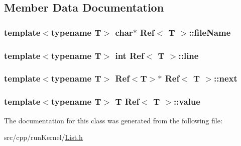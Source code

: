 \subsection{Member Data Documentation}
\hypertarget{class_ref_a857cf85cc41d722e4ac58f22d31e2605}{
\subsubsection[{file\-Name}]{\setlength{\rightskip}{0pt plus 5cm}template$<$typename T$>$ char$\ast$ {\bf Ref}$<$ T $>$\-::file\-Name\hspace{0.3cm}{\ttfamily [private]}}}\label{class_ref_a857cf85cc41d722e4ac58f22d31e2605}
\hypertarget{class_ref_ae083f82bbdedc5c5f3bb42c05b6ef810}{
\subsubsection[{line}]{\setlength{\rightskip}{0pt plus 5cm}template$<$typename T$>$ int {\bf Ref}$<$ T $>$\-::line\hspace{0.3cm}{\ttfamily [private]}}}\label{class_ref_ae083f82bbdedc5c5f3bb42c05b6ef810}
\hypertarget{class_ref_aaad23b64a53270e7539d79df0c5ab386}{
\subsubsection[{next}]{\setlength{\rightskip}{0pt plus 5cm}template$<$typename T$>$ {\bf Ref}$<$T$>$$\ast$ {\bf Ref}$<$ T $>$\-::next\hspace{0.3cm}{\ttfamily [private]}}}\label{class_ref_aaad23b64a53270e7539d79df0c5ab386}
\hypertarget{class_ref_a29d8316b2ffdc7b729efe715354939a5}{
\subsubsection[{value}]{\setlength{\rightskip}{0pt plus 5cm}template$<$typename T$>$ T {\bf Ref}$<$ T $>$\-::value\hspace{0.3cm}{\ttfamily [private]}}}\label{class_ref_a29d8316b2ffdc7b729efe715354939a5}


The documentation for this class was generated from the following file\-:\begin{DoxyCompactItemize}
\item 
src/cpp/run\-Kernel/\hyperlink{_list_8h}{List.\-h}\end{DoxyCompactItemize}
